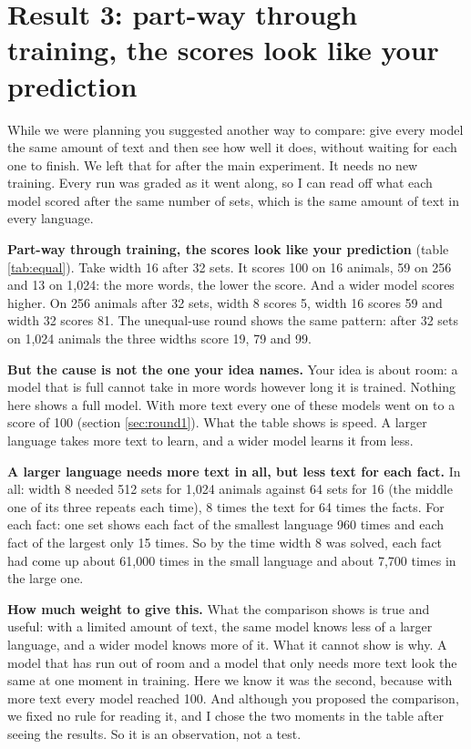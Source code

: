 \section{Result 3: part-way through training, the scores look like your prediction}
\label{sec:equal}

While we were planning you suggested another way to compare: give every model the same amount
of text and then see how well it does, without waiting for each one to finish. We left that
for after the main experiment. It needs no new training. Every run was graded as it went
along, so I can read off what each model scored after the same number of sets, which is the
same amount of text in every language.

\begin{table}[H]
\centering\small

\caption{Facts known (0 to 100) after 32 sets and after 64 sets of text, by width and by the
number of animals in the language. First round, average of the three repeats. A run that was
already solved by then is entered with its final score. I show 32 and 64 sets because earlier
most entries are near 0 and later most are 100.}
\label{tab:equal}
\end{table}

\textbf{Part-way through training, the scores look like your prediction} (table
\ref{tab:equal}). Take width 16 after 32 sets. It scores 100 on 16 animals, 59 on 256 and 13 on
1,024: the more words, the lower the score. And a wider model scores higher. On 256 animals
after 32 sets, width 8 scores 5, width 16 scores 59 and width 32 scores 81. The unequal-use
round shows the same pattern: after 32 sets on 1,024 animals the three widths score 19, 79 and
99.

\textbf{But the cause is not the one your idea names.} Your idea is about room: a model that
is full cannot take in more words however long it is trained. Nothing here shows a full
model. With more text every one of these models went on to a score of 100 (section
\ref{sec:round1}). What the table shows is speed. A larger language takes more text to learn,
and a wider model learns it from less.

\textbf{A larger language needs more text in all, but less text for each fact.} In all: width
8 needed 512 sets for 1,024 animals against 64 sets for 16 (the middle one of its three repeats
each time), 8 times the text for 64 times the facts. For each fact: one set shows each fact of
the smallest language 960 times and each fact of the largest only 15 times. So by the time
width 8 was solved, each fact had come up about 61,000 times in the small language and about
7,700 times in the large one.

\textbf{How much weight to give this.} What the comparison shows is true and useful: with a
limited amount of text, the same model knows less of a larger language, and a wider model knows
more of it. What it cannot show is why. A model that has run out of room and a model that only
needs more text look the same at one moment in training. Here we know it was the second,
because with more text every model reached 100. And although you proposed the comparison, we
fixed no rule for reading it, and I chose the two moments in the table after seeing the
results. So it is an observation, not a test.
